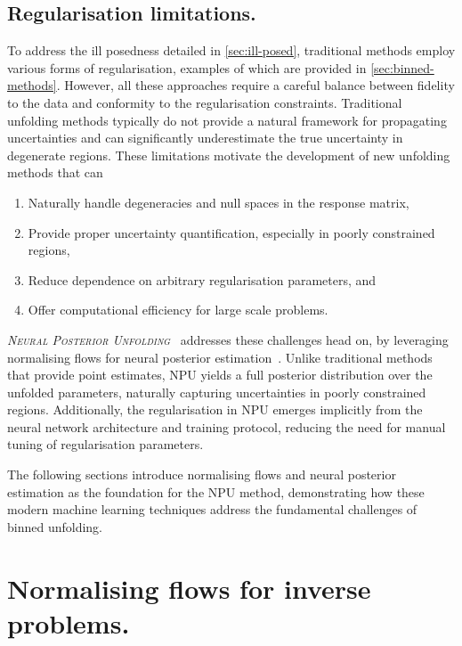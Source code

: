 \subsection{Regularisation limitations.}
    To address the ill posedness detailed in \cref{sec:ill-posed}, traditional methods employ various forms of regularisation, examples of which are provided in \cref{sec:binned-methods}.
    However, all these approaches require a careful balance between fidelity to the data and conformity to the regularisation constraints.
    Traditional unfolding methods typically do not provide a natural framework for propagating uncertainties and can significantly underestimate the true uncertainty in degenerate regions.
    These limitations motivate the development of new unfolding methods that can
    \begin{enumerate}
        \item Naturally handle degeneracies and null spaces in the response matrix,
        \item Provide proper uncertainty quantification, especially in poorly constrained regions,
        \item Reduce dependence on arbitrary regularisation parameters, and
        \item Offer computational efficiency for large scale problems.
    \end{enumerate}
    
    \emph{\textsc{Neural Posterior Unfolding}}~\cite{acosta2024npu} addresses these challenges head on, by leveraging normalising flows for neural posterior estimation~\cite{Papamakarios2016FastEstimation}.
    Unlike traditional methods that provide point estimates, NPU yields a full posterior distribution over the unfolded parameters, naturally capturing uncertainties in poorly constrained regions. 
    Additionally, the regularisation in NPU emerges implicitly from the neural network architecture and training protocol, reducing the need for manual tuning of regularisation parameters.

    The following sections introduce normalising flows and neural posterior estimation as the foundation for the NPU method, demonstrating how these modern machine learning techniques address the fundamental challenges of binned unfolding.
    
\section{Normalising flows for inverse problems.}
\sectionminitoc
